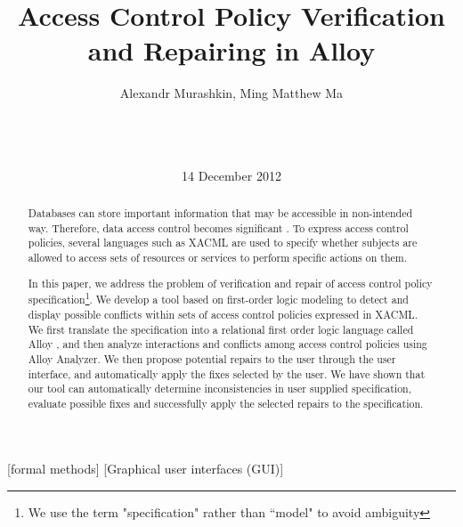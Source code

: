 \documentclass[letterpaper]{acm_proc_article-sp}
\begin{document}
\title{Access Control Policy Verification and Repairing in Alloy}


\author{
\alignauthor Alexandr Murashkin, Ming Matthew Ma \\
       \\
       \\
       \\
}
\date{14 December 2012}
\maketitle

\begin{abstract}

Databases can store important information that may be accessible in non-intended way. Therefore, data access control becomes significant \cite{Fisler:2005:VCA:1062455.1062502}. To express access control policies, several languages such as XACML \cite{oasis:xacml} are used to specify whether subjects are allowed to access sets of resources or services to perform specific actions on them. 

In this paper, we address the problem of verification and repair of access control policy specification\footnote[1]{We use the term "specification" rather than ``model" to avoid ambiguity}. We develop a tool based on first-order logic modeling to detect and display possible conflicts within sets of access control policies expressed in XACML. We first translate the specification into a relational first order logic language called Alloy \cite{jackson:alloy}, and then analyze interactions and conflicts among access control policies using Alloy Analyzer. We then propose potential repairs to the user through the user interface, and automatically apply the fixes selected by the user. We have shown that our tool can automatically determine inconsistencies in user supplied specification, evaluate possible fixes and successfully apply the selected repairs to the specification. 

\end{abstract}

[formal methods]
[Graphical user interfaces (GUI)]
\end{document}
